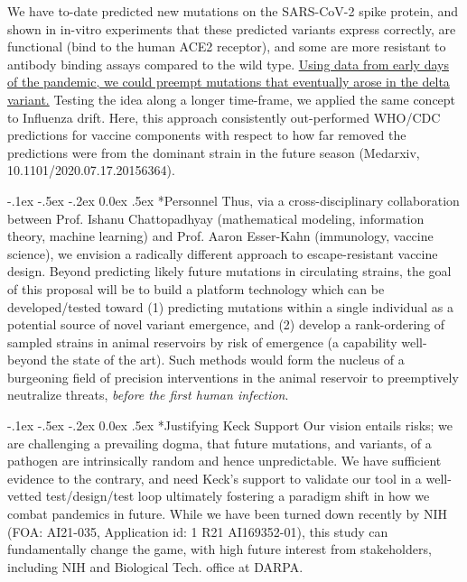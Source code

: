 \documentclass[onecolumn, compsoc,12pt]{IEEEtran}
\makeatletter
\renewcommand\paragraph{\@startsection {section}{1}{\z@}%
                                   {-.1ex \@plus -.5ex \@minus -.2ex}%
                                   {0.0ex \@plus.5ex}%
                                   {\fontsize{11}{10}\selectfont\bfseries\itshape\sffamily\color{black}}}
\def\hcov{SARS-CoV-2\xspace}
\makeatother
\begin{document}
We have to-date predicted new mutations on the \hcov spike protein, and shown in in-vitro experiments that these  predicted variants express correctly, are functional (bind to the human ACE2 receptor), and some are more resistant to antibody binding assays compared to the wild type. \uline{Using data from early days of the pandemic, we could preempt mutations that eventually arose in the delta variant.} Testing the idea along a longer time-frame, we applied the same concept to Influenza drift. Here, this approach consistently out-performed WHO/CDC predictions for vaccine components with respect to how far removed the predictions were  from the dominant strain in the future season (Medarxiv, 10.1101/2020.07.17.20156364).%

\paragraph*{Personnel} Thus, via a cross-disciplinary collaboration  between Prof. Ishanu Chattopadhyay (mathematical modeling, information theory, machine learning) and Prof. Aaron Esser-Kahn (immunology, vaccine science), we envision a radically different approach to escape-resistant vaccine design. Beyond  predicting likely future mutations in circulating strains, the goal of this proposal will be to build a platform technology which can be developed/tested toward (1) predicting mutations within a single individual as a potential source of novel variant emergence, and (2) develop a rank-ordering of  sampled strains in animal reservoirs by  risk of emergence (a capability well-beyond the state of the art). Such methods would form the nucleus of a burgeoning field of precision  interventions  in the animal reservoir to preemptively neutralize threats,  \textit{before the first human infection}.

\paragraph*{Justifying Keck Support} Our vision   entails  risks;  we are challenging a prevailing dogma, that future mutations, and variants, of a pathogen are intrinsically random and hence unpredictable.  We have sufficient evidence to the contrary, and need Keck's support to validate our tool in a well-vetted test/design/test loop  ultimately fostering a paradigm shift in  how we combat pandemics in future. While we have been turned down recently by NIH (FOA: AI21-035, Application id: 1 R21 AI169352-01), this study can fundamentally change the game, with high future interest from stakeholders, including NIH and Biological Tech. office at DARPA.
\end{document}

